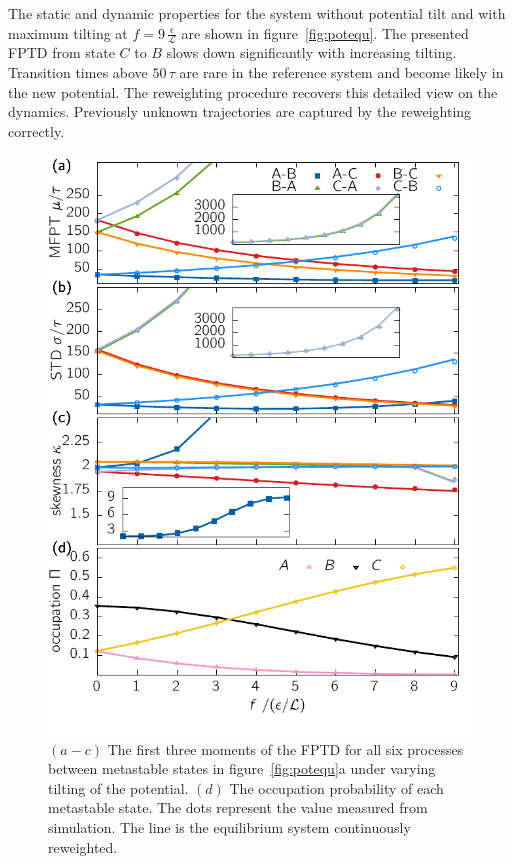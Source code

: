 The static and dynamic properties for the system without potential tilt and with maximum tilting at $f= 9\,\frac{\epsilon}{\mathcal{L}}$ are shown in figure~\ref{fig:potequ}. The presented FPTD from state $C$ to $B$ slows down significantly with increasing tilting. Transition times above $50\,\tau$ are rare in the reference system and become likely in the new potential. The reweighting procedure recovers this detailed view on the dynamics. Previously unknown trajectories are captured by the reweighting correctly. 
\begin{figure}
\centering
 \includegraphics{../plots/Urew/mom_3003.pdf}
 \caption[The first three moments and the population of metastable states for the equilibrium system under varying tilt of the potential.]{$(a-c)$ The first three moments of the FPTD for all six processes between metastable states in figure~\ref{fig:potequ}a under varying tilting of the potential. $(d)$ The occupation probability of each metastable state. The dots represent the value measured from simulation. The line is the equilibrium system continuously reweighted.  }
 \label{fig:momequ}
\end{figure}

